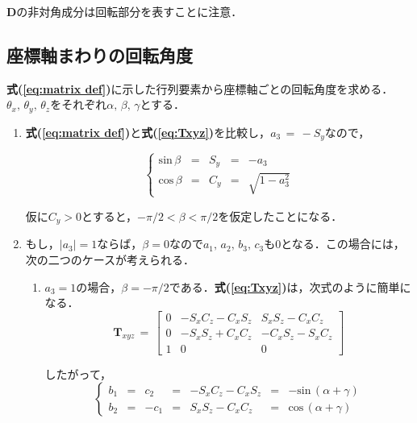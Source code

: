 \noindent $\bm D$の非対角成分は回転部分を表すことに注意．

%
\subsection{座標軸まわりの回転角度}
\textbf{式(\ref{eq:matrix def})}に示した行列要素から座標軸ごとの回転角度を求める．
$\theta_x,\,\theta_y,\,\theta_z$をそれぞれ$\alpha,\,\beta,\,\gamma$とする．

\begin{enumerate}
\item \textbf{式(\ref{eq:matrix def})}と\textbf{式(\ref{eq:Txyz})}を比較し，$a_3\,=\,-S_y$なので，

\begin{equation}
\left\{
\begin{array}{lllll}
\mathrm{sin}\,\beta & = & S_y & = & -a_3\\
\mathrm{cos}\,\beta & = & C_y & = & \sqrt{1-a_3^2}
\end{array}
\right.
\label{eq:angle 1}
\end{equation}

仮に$C_y>0$とすると，$-\pi/2<\beta<\pi/2$を仮定したことになる．
\vspace{2mm}

\item もし，$|a_3|=1$ならば，$\beta=0$なので$a_1,\,a_2,\,b_3,\,c_3$も0となる．この場合には，次の二つのケースが考えられる．

\begin{enumerate}
\item $a_3=1$の場合，$\beta=-\pi/2$である．\textbf{式(\ref{eq:Txyz})}は，次式のように簡単になる．
\begin{equation}
{\bm T}_{xyz} \,=\,
\left[
\begin{array}{ccc}
0 & -S_x C_z - C_x S_z & S_x S_z - C_x C_z\\
0 & -S_x S_z + C_x C_z & -C_x S_z - S_x C_z\\
1 & 0 & 0
\end{array}
\right]
\label{eq:Txyz=1}
\end{equation}

したがって，
\begin{equation}
\left\{
\begin{array}{lllllll}
b_1 & = & c_2  & = & -S_x C_z - C_x S_z & = & -\mathrm{sin}\,(\alpha+\gamma)\\
b_2 & = & -c_1 & = & S_x S_z - C_x C_z  & = &  \mathrm{cos}\,(\alpha+\gamma)
\end{array}
\right.
\label{eq:angle 2}
\end{equation}
\vspace{2mm}


\end{enumerate}
\end{enumerate}
